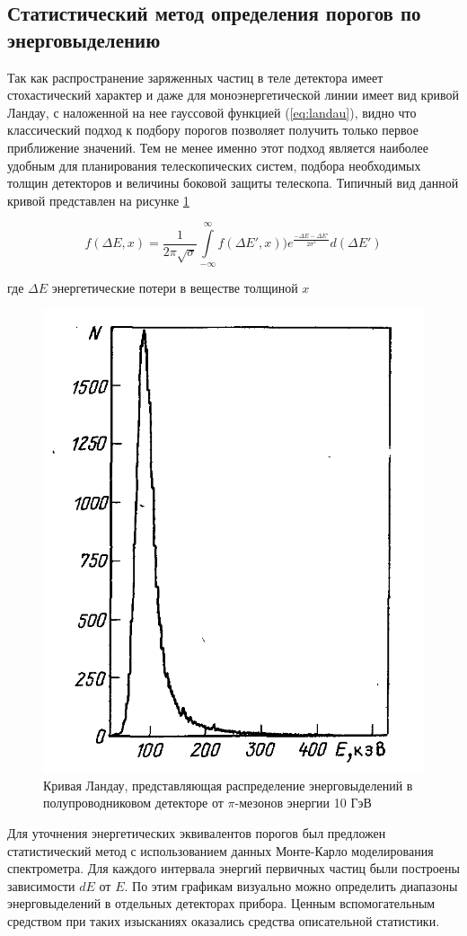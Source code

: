 \subsection{Статистический метод определения порогов по энерговыделению}
Так как распространение заряженных частиц в теле детектора имеет стохастический характер и даже для моноэнергетической линии имеет вид кривой Ландау, с наложенной на нее гауссовой функцией (\ref{eq:landau}),  видно что классический подход к подбору порогов позволяет получить только первое приближение значений. Тем не менее именно этот подход является наиболее удобным для планирования телескопических систем, подбора необходимых толщин детекторов и величины боковой защиты телескопа. Типичный вид данной кривой представлен на рисунке \ref{fig:landau}

\begin{equation} \label{eq:landau}
f(\Delta E, x) = \frac{1}{2\pi\sqrt{\sigma}} \int\limits_{-\infty}^{\infty}{f(\Delta E', x))e^{\frac{-\Delta E - \Delta E'}{2\sigma^2}}d(\Delta E')}
\end{equation}

где $ \Delta E $ энергетические потери в веществе толщиной $ x $


\begin{figure}
\centering
\includegraphics[width=0.4\linewidth]{images/landau}
\caption[Кривая Ландау]{Кривая Ландау, представляющая распределение энерговыделений в полупроводниковом детекторе от $ \pi $-мезонов энергии 10 ГэВ}
\label{fig:landau}
\end{figure}

Для уточнения энергетических эквивалентов порогов был предложен статистический метод с использованием данных Монте-Карло моделирования спектрометра. Для каждого интервала энергий первичных частиц были построены зависимости $ dE $ от $ E $. По этим графикам визуально можно определить диапазоны энерговыделений в отдельных детекторах прибора. Ценным вспомогательным средством при таких изысканиях оказались средства описательной статистики.

